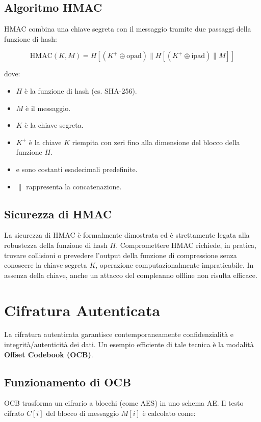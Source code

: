 \subsection{Algoritmo HMAC}
HMAC combina una chiave segreta con il messaggio tramite due passaggi della funzione di hash:

$$\text{HMAC}(K, M) = H[(K^+ \oplus \text{opad}) \mathbin{\|} H[(K^+ \oplus \text{ipad}) \mathbin{\|} M]]$$

dove:
\begin{itemize}
    \item $H$ è la funzione di hash (es. SHA-256).
    \item $M$ è il messaggio.
    \item $K$ è la chiave segreta.
    \item $K^+$ è la chiave $K$ riempita con zeri fino alla dimensione del blocco della funzione $H$.
    \item {} e  sono costanti esadecimali predefinite.
    \item $\|$ rappresenta la concatenazione.
\end{itemize}

\subsection{Sicurezza di HMAC}
La sicurezza di HMAC è formalmente dimostrata ed è strettamente legata alla robustezza della funzione di hash $H$. Compromettere HMAC richiede, in pratica, trovare collisioni o prevedere l’output della funzione di compressione senza conoscere la chiave segreta $K$, operazione computazionalmente impraticabile. In assenza della chiave, anche un attacco del compleanno offline non risulta efficace.

\section{Cifratura Autenticata}

La cifratura autenticata garantisce contemporaneamente confidenzialità e integrità/autenticità dei dati. Un esempio efficiente di tale tecnica è la modalità \textbf{Offset Codebook (OCB)}.

\subsection{Funzionamento di OCB}
OCB trasforma un cifrario a blocchi (come AES) in uno schema AE. Il testo cifrato $C[i]$ del blocco di messaggio $M[i]$ è calcolato come:

